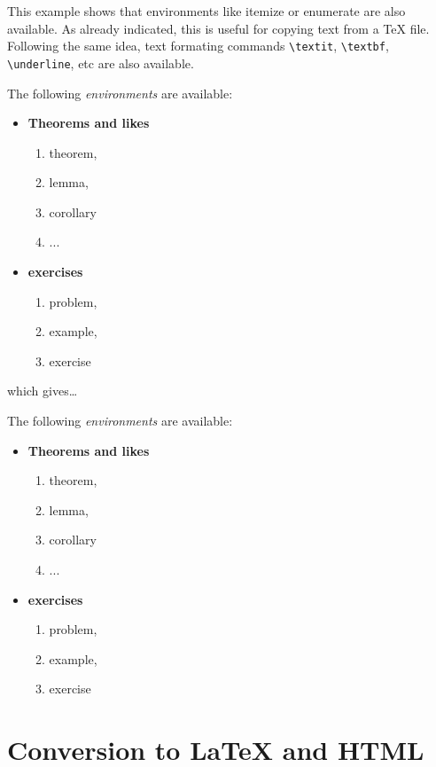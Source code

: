 \documentclass[11pt]{article}
\begin{document}
    This example shows that environments like itemize or enumerate are also
available. As already indicated, this is useful for copying text from a
TeX file. Following the same idea, text formating commands
\texttt{\textbackslash{}textit}, \texttt{\textbackslash{}textbf},
\texttt{\textbackslash{}underline}, etc are also available.

    \begin{listing}
The following \textit{environments} are available:
\begin{itemize}
    \item \textbf{Theorems and likes}
    \begin{enumerate}
        \item theorem,
        \item lemma,
        \item corollary
        \item ...
    \end{enumerate}
    \item \textbf{exercises}
    \begin{enumerate}
        \item problem,
        \item example,
        \item exercise
    \end{enumerate}
\end{itemize}
\end{listing}

    which gives\ldots{}

The following \textit{environments} are available:

\begin{itemize}
\item \textbf{Theorems and likes}
\begin{enumerate}
\item theorem,
\item lemma,
\item corollary
\item ...
\end{enumerate}
\item \textbf{exercises}
\begin{enumerate}
\item problem,
\item example,
\item exercise
\end{enumerate}
\end{itemize}

    \section{Conversion to LaTeX and
HTML}\label{conversion-to-latex-and-html}
\end{document}
